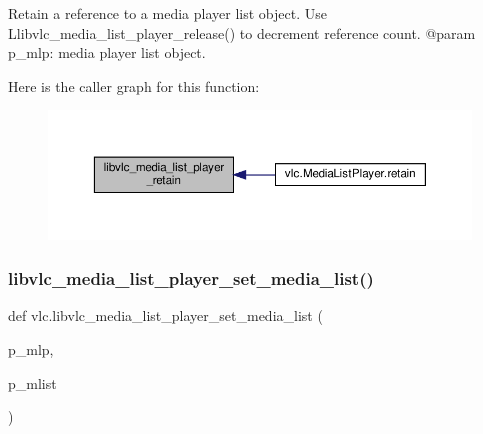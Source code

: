 \begin{DoxyVerb}Retain a reference to a media player list object. Use
L{libvlc_media_list_player_release}() to decrement reference count.
@param p_mlp: media player list object.
\end{DoxyVerb}
 Here is the caller graph for this function\+:
\nopagebreak
\begin{figure}[H]
\begin{center}
\leavevmode
\includegraphics[width=350pt]{namespacevlc_ac79a3046c80d6a0269c84975dd996085_icgraph}
\end{center}
\end{figure}
\mbox{\label{namespacevlc_ad7bd543571d19ee4ae115ec8ff31db94}} 
\subsubsection{\texorpdfstring{libvlc\+\_\+media\+\_\+list\+\_\+player\+\_\+set\+\_\+media\+\_\+list()}{libvlc\_media\_list\_player\_set\_media\_list()}}
{\footnotesize\ttfamily def vlc.\+libvlc\+\_\+media\+\_\+list\+\_\+player\+\_\+set\+\_\+media\+\_\+list (\begin{DoxyParamCaption}\item[{}]{p\+\_\+mlp,  }\item[{}]{p\+\_\+mlist }\end{DoxyParamCaption})}

